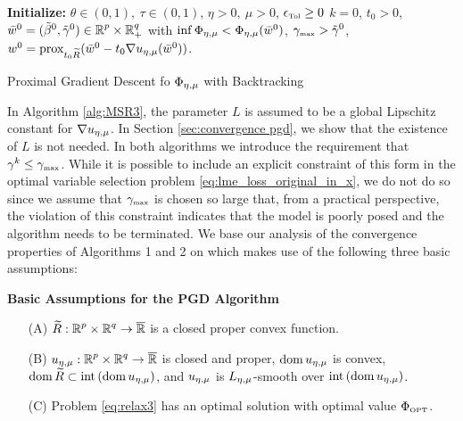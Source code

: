 \begin{algorithm}[ht]
\SetAlgoLined
{\bf Initialize:} 
$\theta\in(0,1),\ \tau\in(0,1)$,
$\eta>0,\ \mu>0$, $\epsilon_{\mbox{\tiny Tol}}\ge 0$
$k=0$, $t_0>0$, ${\bar w}^{0}=(\tilde\beta^0,{\tilde{\gamma}}^0)\in {\operatorname{\mathbb{R}}^p}\times\operatorname{\mathbb{R}}^q_+$
with $\inf\Phi_{\eta,\mu} <\Phi_{\eta,\mu}({\bar w}^0)$, 
${\gamma_{\mbox{\tiny max}}}>{\tilde{\gamma}}^0$, 
$w^0={\mathrm{prox}}_{t_0{\widetilde R}}({\bar w}^{0}-t_0\nabla u_{\eta,\mu}({\bar w}^0))$.
\\
\smallskip
\caption{\label{alg:pgd with bt}Proximal Gradient Descent 
fo $\Phi_{\eta,\mu}$ with Backtracking}
\end{algorithm}
\medskip


In Algorithm \ref{alg:MSR3}, 
the parameter $L$ is assumed to be a global Lipschitz
constant for $\nabla {u_{\eta,\mu}}$. In Section \ref{sec:convergence pgd}, we show that the existence of $L$ is not needed.
In both algorithms we introduce the requirement that $\gamma^k\le{\gamma_{\mbox{\tiny max}}}$.
While it is possible to include an explicit constraint of this form in the 
optimal variable selection problem \eqref{eq:lme_loss_original_in_x}, 
we do not do so since we assume that ${\gamma_{\mbox{\tiny max}}}$ is chosen 
so large that, from a practical perspective, 
the violation of this constraint indicates that the model is 
poorly posed and the algorithm needs to be terminated.
We base our analysis of the convergence properties of
Algorithms 1 and 2 on \cite[Theorem 10.15]{AB17} which makes use
of the following three basic assumptions:
\smallskip

\noindent
{\bf Basic Assumptions for the PGD Algorithm}
\begin{enumerate}
\item[(A)] ${\widetilde R}:{\operatorname{\mathbb{R}}^p}\times{\operatorname{\mathbb{R}}^q}\rightarrow {\overline{\operatorname{\mathbb{R}}}}$ is a closed proper convex function.
\item[(B)] ${u_{\eta,\mu}}:{\operatorname{\mathbb{R}}^p}\times{\operatorname{\mathbb{R}}^q}\rightarrow {\overline{\operatorname{\mathbb{R}}}}$ is closed and proper, 
$\operatorname{\mathrm{dom}}{{u_{\eta,\mu}}}$ is
convex, $\operatorname{\mathrm{dom}}{{\widetilde R}}\subset\mathrm{int}\left( \operatorname{\mathrm{dom}}{{u_{\eta,\mu}}}\right)$, and
${u_{\eta,\mu}}$ is $L_{\eta,\mu}$-smooth over $\mathrm{int}\left( \operatorname{\mathrm{dom}}{{u_{\eta,\mu}}}\right)$.
\item[(C)] Problem \eqref{eq:relax3} has an optimal solution with optimal 
value $\Phi_{\mbox{\tiny OPT}}$.
\end{enumerate}

